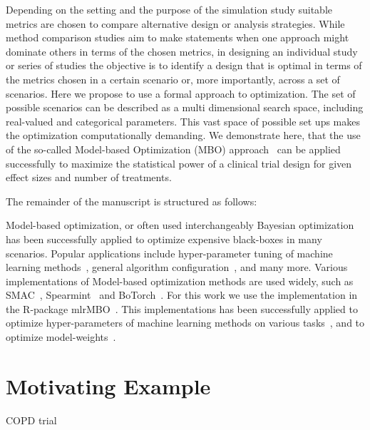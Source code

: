 \documentclass[bimj,fleqn]{w-art}
\theoremstyle{plain}
\theoremstyle{definition}
\begin{document}
Depending on the setting and the purpose of the simulation study suitable metrics are chosen to compare alternative design or analysis strategies. 
While method comparison studies aim to make statements when one approach might dominate others in terms of the chosen metrics, in designing an individual study or series of studies the objective is to identify a design that is optimal in terms of the metrics chosen in a certain scenario or, more importantly, across a set of scenarios. 
Here we propose to use a formal approach to optimization. 
The set of possible scenarios can be described as a multi dimensional search space, including real-valued and categorical parameters.
This vast space of possible set ups makes the optimization computationally demanding.
We demonstrate here, that the use of the so-called Model-based Optimization (MBO) approach~\cite{jones_taxonomy_2001} can be applied successfully to maximize the statistical power of a clinical trial design for given effect sizes and number of treatments.

The remainder of the manuscript is structured as follows:



Model-based optimization, or often used interchangeably Bayesian optimization has been successfully applied to optimize expensive black-boxes in many scenarios.
Popular applications include hyper-parameter tuning of machine learning methods~\cite{snoek_practical_2012}, general algorithm configuration~\cite{hutter_sequential_2011}, and many more.
Various implementations of Model-based optimization methods are used widely, such as SMAC~\cite{hutter_sequential_2011}, Spearmint~\cite{snoek_practical_2012} and BoTorch~\cite{balandat_botorch_2020}.
For this work we use the implementation in the R-package mlrMBO~\cite{bischl_mlrmbo_2017}.
This implementations has been successfully applied to optimize hyper-parameters of machine learning methods on various tasks~\cite{bischl_mlrmbo_2017, wozniak_candle_2018}, and to optimize model-weights~\cite{richter_modelbased_2019,browaeys_nichenet_2020}.


\section{Motivating Example}
COPD trial
\cite{friede_adaptive_2020}
\end{document}

